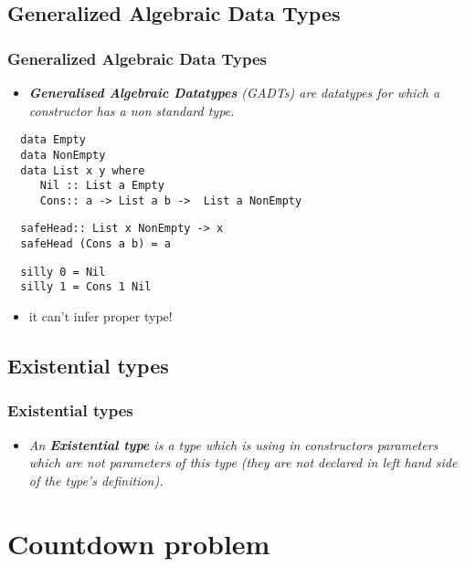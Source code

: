 \documentclass[aspectratio=43]{beamer}
\begin{document}
\subsection{Generalized Algebraic Data Types}

\begin{frame}[fragile]
 \frametitle{Generalized Algebraic Data Types}
 \begin{itemize}
  \item \textit{\textbf{Generalised Algebraic Datatypes} (GADTs) are datatypes for which a constructor has a non standard type.}
 \end{itemize}
 \pause
 \begin{lstlisting}
  data Empty
  data NonEmpty
  data List x y where
     Nil :: List a Empty
     Cons:: a -> List a b ->  List a NonEmpty
 \end{lstlisting}
 \pause
 \begin{lstlisting}
  safeHead:: List x NonEmpty -> x
  safeHead (Cons a b) = a
 \end{lstlisting}
 \pause
 \begin{lstlisting}
  silly 0 = Nil
  silly 1 = Cons 1 Nil
 \end{lstlisting}
 \pause
 \begin{itemize}
  \item it can't infer proper type!
 \end{itemize}
\end{frame}

\subsection{Existential types}

\begin{frame}[fragile]
  \frametitle{Existential types}
  \begin{itemize}
   \item \textit{An \textbf{Existential type} is a type which is using in constructors parameters which are not parameters of this type (they are not declared in left hand side of the type's definition).}
  \end{itemize}
\end{frame}








\section{Countdown problem}
\end{document}
